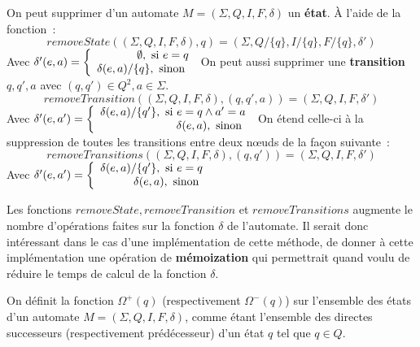\begin{Definition}
  On peut supprimer d'un automate \(M = (\Sigma, Q, I, F, \delta)\) un 
  \textbf{état}. À l'aide de la fonction~:
  \[
    removeState((\Sigma, Q, I, F, \delta), q) = (\Sigma, Q/\{q\}, I/\{q\}, 
    F/\{q\}, \delta') 
  \]
  Avec \(\delta'(e, a) = \left \{
    \begin{array}{r c l}
      \emptyset, \text{ si } e = q\\
      \delta(e, a)/\{q\}, \text{ sinon } \\
    \end{array}
    \right . \)
  On peut aussi supprimer une \textbf{transition} \(q, q', a\) avec \((q, q') 
  \in Q^2, a \in \Sigma\). 
  \[
    removeTransition((\Sigma, Q, I, F, \delta), (q, q', a)) = 
    (\Sigma, Q, I, F, \delta')
  \]
  Avec \(\delta'(e, a') = \left \{
    \begin{array}{r c l}
      \delta(e, a)/\{q'\}, \text{ si } e = q \land a' = a\\
      \delta(e, a), \text{ sinon } \\
    \end{array}
    \right .\)
  On étend celle-ci à la suppression de toutes les transitions entre 
  deux n\oe uds de la façon suivante~:
  \[
    removeTransitions((\Sigma, Q, I, F, \delta), (q, q')) =
    (\Sigma, Q, I, F, \delta')
  \]
  Avec \(\delta'(e, a') = \left \{
    \begin{array}{r c l}
      \delta(e, a)/\{q'\}, \text{ si } e = q\\
      \delta(e, a), \text{ sinon } \\
    \end{array}
    \right .\)
\end{Definition}

\begin{Remarque}
  Les fonctions \(removeState, removeTransition\) et \(removeTransitions\)
  augmente le nombre d'opérations faites sur la fonction \(\delta\) de 
  l'automate. Il serait donc intéressant dans le cas d'une implémentation de 
  cette méthode, de donner à cette implémentation une opération de 
  \textbf{mémoization} qui permettrait quand voulu de réduire le temps de calcul 
  de la fonction \(\delta\).
\end{Remarque}

\begin{Definition}
  On définit la fonction \(\Omega^{+}(q)\) (respectivement \(\Omega^{-}(q)\)) 
  sur l'ensemble des états d'un automate \(M = (\Sigma, Q, I, F, \delta)\), 
  comme étant l'ensemble des directes successeurs (respectivement prédécesseur) 
  d'un état \(q\) tel que \(q \in Q\).
\end{Definition}

